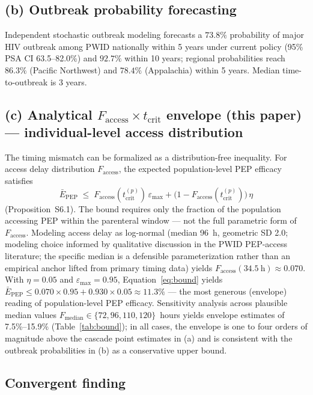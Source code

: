\documentclass[11pt]{article}
\theoremstyle{definition}
\theoremstyle{remark}
\newcommand{\Ebarpep}{\bar{E}_{\text{PEP}}}
\newcommand{\Faccess}{F_{\text{access}}}
\newcommand{\tcrit}{t_{\text{crit}}}
\newcommand{\emax}{\varepsilon_{\max}}
\begin{document}
\subsection*{(b) Outbreak probability forecasting}

Independent stochastic outbreak modeling\cite{demidont_companion} forecasts a $73.8\%$ probability of major HIV outbreak among PWID nationally within 5 years under current policy (95\% PSA CI 63.5--82.0\%) and $92.7\%$ within 10 years; regional probabilities reach $86.3\%$ (Pacific Northwest) and $78.4\%$ (Appalachia) within 5 years. Median time-to-outbreak is 3 years.

\subsection*{(c) Analytical $\Faccess \times \tcrit$ envelope (this paper) --- individual-level access distribution}

The timing mismatch can be formalized as a distribution-free inequality. For access delay distribution $\Faccess$, the expected population-level PEP efficacy satisfies
\begin{equation}
\Ebarpep \;\leq\; \Faccess(\tcrit^{(p)})\,\emax + \big(1 - \Faccess(\tcrit^{(p)})\big)\,\eta
\label{eq:bound}
\end{equation}
(Proposition~S6.1). The bound requires only the fraction of the population accessing PEP within the parenteral window --- not the full parametric form of $\Faccess$. Modeling access delay as log-normal (median 96~h, geometric SD 2.0; modeling choice informed by qualitative discussion in the PWID PEP-access literature\cite{taylor2019,baugher2025}; the specific median is a defensible parameterization rather than an empirical anchor lifted from primary timing data) yields $\Faccess(34.5~\text{h}) \approx 0.070$. With $\eta = 0.05$ and $\emax = 0.95$, Equation~\ref{eq:bound} yields $\Ebarpep \leq 0.070 \times 0.95 + 0.930 \times 0.05 \approx 11.3\%$ --- the most generous (envelope) reading of population-level PEP efficacy. Sensitivity analysis across plausible median values $F_{\text{median}} \in \{72, 96, 110, 120\}$~hours yields envelope estimates of 7.5\%--15.9\% (Table~\ref{tab:bound}); in all cases, the envelope is one to four orders of magnitude above the cascade point estimates in (a) and is consistent with the outbreak probabilities in (b) as a conservative upper bound.

\subsection*{Convergent finding}
\end{document}
